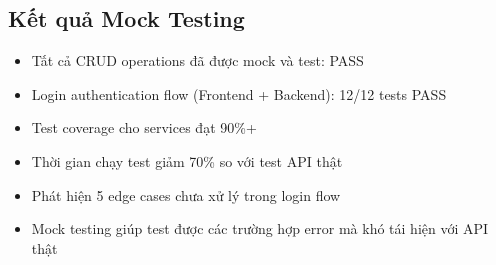 \subsection{Kết quả Mock Testing}
\begin{itemize}
    \item Tất cả CRUD operations đã được mock và test: PASS
    \item Login authentication flow (Frontend + Backend): 12/12 tests PASS
    \item Test coverage cho services đạt 90\%+
    \item Thời gian chạy test giảm 70\% so với test API thật
    \item Phát hiện 5 edge cases chưa xử lý trong login flow
    \item Mock testing giúp test được các trường hợp error mà khó tái hiện với API thật
\end{itemize}
